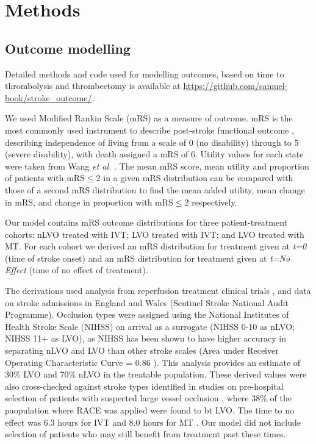 \section{Methods}

\subsection{Outcome modelling}

Detailed methods and code used for modelling outcomes, based on time to thrombolysis and thrombectomy is available at \url{https://github.com/samuel-book/stroke_outcome/}.

We used Modified Rankin Scale (mRS) as a measure of outcome. mRS is the most commonly used instrument to describe post-stroke functional outcome \cite{quinn_functional_2009}, describing independence of living from a scale of 0 (no disability) through to 5 (severe disability), with death assigned a mRS of 6. Utility values for each state were taken from Wang \textit{et al.} 
 \cite{wang_utility-weighted_2020}. The mean mRS score, mean utility and proportion of patients with mRS$\leq$2 in a given mRS distribution can be compared with those of a second mRS distribution to find the mean added utility, mean change in mRS, and change in proportion with mRS$\leq$2 respectively.

Our model contains mRS outcome distributions for three patient-treatment cohorts: nLVO treated with IVT; LVO treated with IVT; and LVO treated with MT. For each cohort we derived an mRS distribution for treatment given at \emph{t=0} (time of stroke onset) and an mRS distribution for treatment given at \emph{t=No Effect} (time of no effect of treatment).

The derivations used analysis from reperfusion treatment clinical trials \cite{lees_time_2010, emberson_effect_2014, goyal_endovascular_2016, fransen_time_2016}, and data on stroke admissions in England and Wales (Sentinel Stroke National Audit Programme). Occlusion types were assigned using the National Institutes of Health Stroke Scale (NIHSS) on arrival as a surrogate (NIHSS 0-10 as nLVO; NIHSS 11+ as LVO), as NIHSS has been shown to have higher accuracy in separating nLVO and LVO than other stroke scales (Area under Receiver Operating Characteristic Curve = 0.86 \cite{duvekot_comparison_2021}). This analysis provides an estimate of 30\% LVO and 70\% nLVO in the treatable population. These derived values were also cross-checked against stroke types identified in studies on pre-hospital selection of patients with suspected large vessel occlusion \cite{de_la_ossa_herrero_design_2013}, where 38\% of the paopulation where RACE was applied were found to bt LVO. The time to no effect was 6.3 hours for IVT \cite{emberson_effect_2014} and 8.0 hours for MT \cite{ fransen_time_2016}. Our model did not include selection of patients who may still benefit from treatment past these times.

